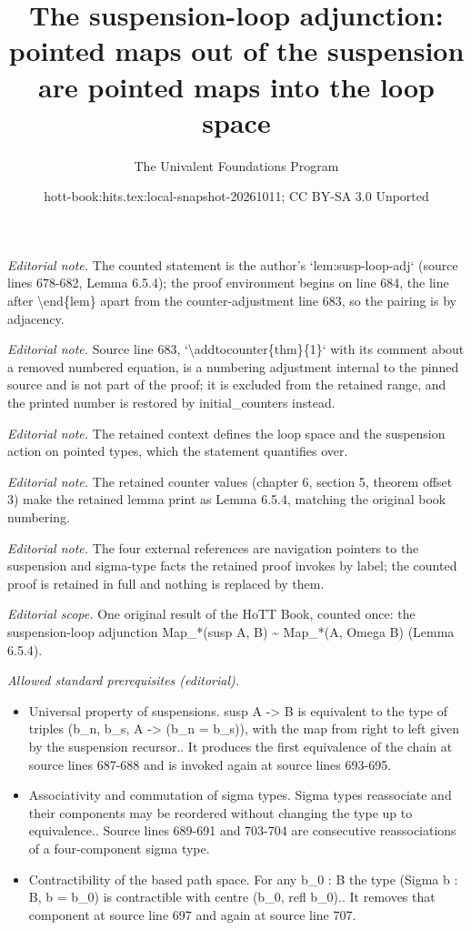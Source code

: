 \documentclass[10pt,a4paper]{article}
\title{The suspension-loop adjunction: pointed maps out of the suspension are pointed maps into the loop space}
\author{The Univalent Foundations Program}
\date{hott-book:hits.tex:local-snapshot-20261011; CC BY-SA 3.0 Unported}
\newcounter{chapter}
\theoremstyle{definition}
\theoremstyle{remark}
\numberwithin{equation}{section}
\begin{document}
\maketitle
\setcounter{chapter}{6}
\setcounter{section}{5}
\setcounter{thm}{3}
\noindent\textit{Editorial note.} The counted statement is the author's `lem:susp-loop-adj` (source lines 678-682, Lemma 6.5.4); the proof environment begins on line 684, the line after \textbackslash{}end\{lem\} apart from the counter-adjustment line 683, so the pairing is by adjacency.\par\medskip
\noindent\textit{Editorial note.} Source line 683, `\textbackslash{}addtocounter\{thm\}\{1\}` with its comment about a removed numbered equation, is a numbering adjustment internal to the pinned source and is not part of the proof; it is excluded from the retained range, and the printed number is restored by initial\_counters instead.\par\medskip
\noindent\textit{Editorial note.} The retained context defines the loop space and the suspension action on pointed types, which the statement quantifies over.\par\medskip
\noindent\textit{Editorial note.} The retained counter values (chapter 6, section 5, theorem offset 3) make the retained lemma print as Lemma 6.5.4, matching the original book numbering.\par\medskip
\noindent\textit{Editorial note.} The four external references are navigation pointers to the suspension and sigma-type facts the retained proof invokes by label; the counted proof is retained in full and nothing is replaced by them.\par\medskip
\noindent\textit{Editorial scope.} One original result of the HoTT Book, counted once: the suspension-loop adjunction Map\_*(susp A, B) \textasciitilde{} Map\_*(A, Omega B) (Lemma 6.5.4).\par\medskip
\noindent\textit{Allowed standard prerequisites (editorial).}\begin{itemize}
\item Universal property of suspensions. susp A -> B is equivalent to the type of triples (b\_n, b\_s, A -> (b\_n = b\_s)), with the map from right to left given by the suspension recursor.. It produces the first equivalence of the chain at source lines 687-688 and is invoked again at source lines 693-695.
\item Associativity and commutation of sigma types. Sigma types reassociate and their components may be reordered without changing the type up to equivalence.. Source lines 689-691 and 703-704 are consecutive reassociations of a four-component sigma type.
\item Contractibility of the based path space. For any b\_0 : B the type (Sigma b : B, b = b\_0) is contractible with centre (b\_0, refl b\_0).. It removes that component at source line 697 and again at source line 707.
\end{itemize}\medskip
\end{document}
